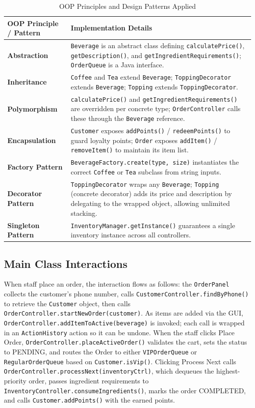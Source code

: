 \documentclass[11pt,a4paper]{article}
\begin{document}
\begin{table}[H]
\centering
\caption{OOP Principles and Design Patterns Applied}
\label{tab:oop_concepts}
\begin{tabular}{lp{10cm}}
\toprule
\textbf{OOP Principle / Pattern} & \textbf{Implementation Details} \\
\midrule
\textbf{Abstraction} & \texttt{Beverage} is an abstract class defining \texttt{calculatePrice()}, \texttt{getDescription()}, and \texttt{getIngredientRequirements()}; \texttt{OrderQueue} is a Java interface. \\
\textbf{Inheritance} & \texttt{Coffee} and \texttt{Tea} extend \texttt{Beverage}; \texttt{ToppingDecorator} extends \texttt{Beverage}; \texttt{Topping} extends \texttt{ToppingDecorator}. \\
\textbf{Polymorphism} & \texttt{calculatePrice()} and \texttt{getIngredientRequirements()} are overridden per concrete type; \texttt{OrderController} calls these through the \texttt{Beverage} reference. \\
\textbf{Encapsulation} & \texttt{Customer} exposes \texttt{addPoints()} / \texttt{redeemPoints()} to guard loyalty points; \texttt{Order} exposes \texttt{addItem()} / \texttt{removeItem()} to maintain its item list. \\
\textbf{Factory Pattern} & \texttt{BeverageFactory.create(type, size)} instantiates the correct \texttt{Coffee} or \texttt{Tea} subclass from string inputs. \\
\textbf{Decorator Pattern} & \texttt{ToppingDecorator} wraps any \texttt{Beverage}; \texttt{Topping} (concrete decorator) adds its price and description by delegating to the wrapped object, allowing unlimited stacking. \\
\textbf{Singleton Pattern} & \texttt{InventoryManager.getInstance()} guarantees a single inventory instance across all controllers. \\
\bottomrule
\end{tabular}
\end{table}

\subsection{Main Class Interactions}
When staff place an order, the interaction flows as follows: the \texttt{OrderPanel} collects the customer's phone number, calls \texttt{CustomerController.findByPhone()} to retrieve the \texttt{Customer} object, then calls \texttt{OrderController.startNewOrder(customer)}. As items are added via the GUI, \texttt{OrderController.addItemToActive(beverage)} is invoked; each call is wrapped in an \texttt{ActionHistory} action so it can be undone. When the staff clicks Place Order, \texttt{OrderController.placeActiveOrder()} validates the cart, sets the status to PENDING, and routes the Order to either \texttt{VIPOrderQueue} or \texttt{RegularOrderQueue} based on \texttt{Customer.isVip()}. Clicking Process Next calls \texttt{OrderController.processNext(inventoryCtrl)}, which dequeues the highest-priority order, passes ingredient requirements to \texttt{InventoryController.consumeIngredients()}, marks the order COMPLETED, and calls \texttt{Customer.addPoints()} with the earned points.
\end{document}

